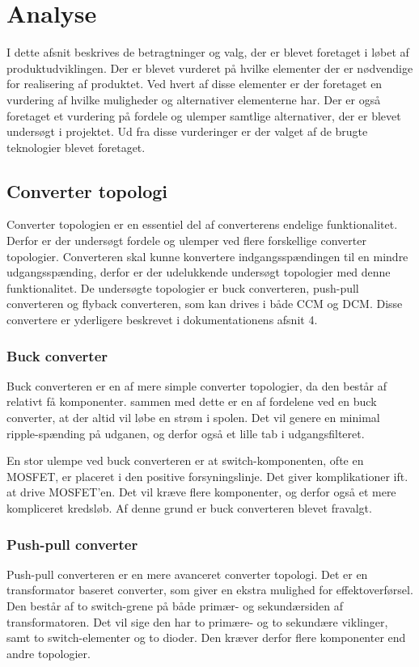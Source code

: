
\chapter{Analyse}
I dette afsnit beskrives de betragtninger og valg, der er blevet foretaget i løbet af produktudviklingen. Der er blevet vurderet på hvilke elementer der er nødvendige for realisering af produktet. Ved hvert af disse elementer er der foretaget en vurdering af hvilke muligheder og alternativer elementerne har. Der er også foretaget et vurdering på fordele og ulemper samtlige alternativer, der er blevet undersøgt i projektet. Ud fra disse vurderinger er der valget af de brugte teknologier blevet foretaget. 

\section{Converter topologi}
Converter topologien er en essentiel del af converterens endelige funktionalitet. Derfor er der undersøgt fordele og ulemper ved flere forskellige converter topologier. Converteren skal kunne konvertere indgangsspændingen til en mindre udgangsspænding, derfor er der udelukkende undersøgt topologier med denne funktionalitet. De undersøgte topologier er buck converteren, push-pull converteren og flyback converteren, som kan drives i både CCM og DCM. Disse convertere er yderligere beskrevet i dokumentationens afsnit 4.

\subsection{Buck converter}
Buck converteren er en af mere simple converter topologier, da den består af relativt få komponenter. sammen med dette er en af fordelene ved en buck converter, at der altid vil løbe en strøm i spolen. Det vil genere en minimal ripple-spænding på udganen, og derfor også et lille tab i udgangsfilteret. 

En stor ulempe ved buck converteren er at switch-komponenten, ofte en MOSFET, er placeret i den positive forsyningslinje. Det giver komplikationer ift. at drive MOSFET'en. Det vil kræve flere komponenter, og derfor også et mere kompliceret kredsløb. Af denne grund er buck converteren blevet fravalgt\cite{buck-converter}.

\subsection{Push-pull converter}
Push-pull converteren er en mere avanceret converter topologi. Det er en transformator baseret converter, som giver en ekstra mulighed for effektoverførsel. Den består af to switch-grene på både primær- og sekundærsiden af transformatoren. Det vil sige den har to primære- og to sekundære viklinger, samt to switch-elementer og to dioder. Den kræver derfor flere komponenter end andre topologier. 

